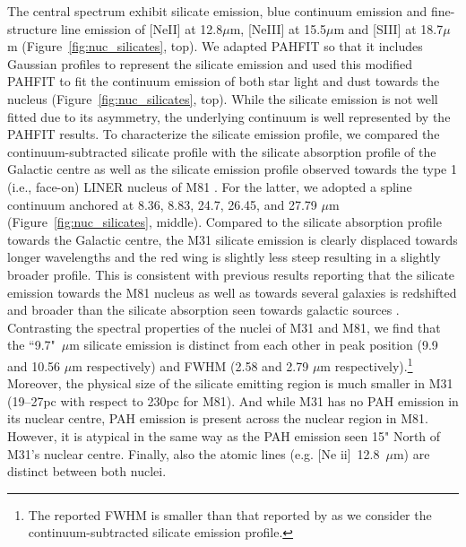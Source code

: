 \documentclass[useAMS,usenatbib,a4paper]{mn2e}
\begin{document}
The central spectrum exhibit silicate emission, blue continuum emission and fine-structure line emission of [NeII] at 12.8$\mu$m, [NeIII] at 15.5$\mu$m and [SIII] at 18.7$\mu$m (Figure~\ref{fig:nuc_silicates}, top). We adapted PAHFIT so that it includes Gaussian profiles to represent the silicate emission and used this modified PAHFIT to fit the continuum emission of both star light and dust towards the nucleus (Figure~\ref{fig:nuc_silicates}, top). While the silicate emission is not well fitted due to its asymmetry, the underlying continuum is well represented by the PAHFIT results. To characterize the silicate emission profile, we compared the continuum-subtracted silicate profile with the silicate absorption profile of the Galactic centre \citep{Chiar2006} as well as the silicate emission profile observed towards the type 1 (i.e., face-on) LINER nucleus of M81 \citep[][Figure~\ref{fig:nuc_silicates}, bottom]{Smith2010}. For the latter, we adopted a spline continuum anchored at 8.36, 8.83, 24.7, 26.45, and 27.79 $\mu$m (Figure~\ref{fig:nuc_silicates}, middle). Compared to the silicate absorption profile towards the Galactic centre, the M31 silicate emission is clearly displaced towards longer wavelengths and the red wing is slightly less steep resulting in a slightly broader profile. This is consistent with previous results reporting that the silicate emission towards  the M81 nucleus as well as towards several galaxies is redshifted and broader than the silicate absorption seen towards galactic sources \citep[e.g.][]{Sturm2005, Sturm2006, Netzer2007, Smith2010}. Contrasting the spectral properties of the nuclei of M31 and M81, we find that the ``9.7"~$\mu$m silicate emission is distinct from each other in peak position (9.9 and 10.56 $\mu$m respectively) and FWHM (2.58 and 2.79 $\mu$m respectively).\footnote{The reported FWHM is smaller than that reported by \citet{Smith2010} as we consider the continuum-subtracted silicate emission profile.} Moreover, the physical size of the silicate emitting region is much smaller in M31 (19--27pc with respect to 230pc for M81). And while M31 has no PAH emission in its nuclear centre, PAH emission is present across the nuclear region in M81. However, it is atypical in the same way as the PAH emission seen 15" North of M31's nuclear centre. Finally, also the atomic lines (e.g. [Ne {\sc ii}]~12.8~$\mu$m) are distinct between both nuclei. 
\end{document}
